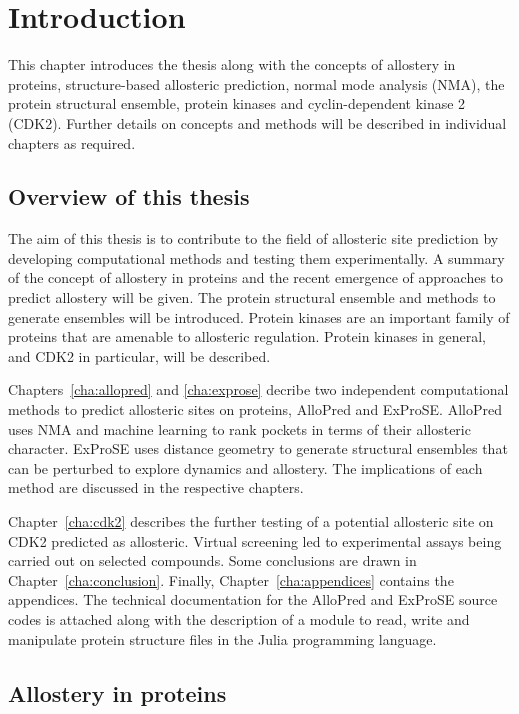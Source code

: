 \chapter{Introduction}
\label{cha:introduction}

This chapter introduces the thesis along with the concepts of allostery in proteins, structure-based allosteric prediction, normal mode analysis (NMA), the protein structural ensemble, protein kinases and cyclin-dependent kinase 2 (CDK2).
Further details on concepts and methods will be described in individual chapters as required.


\section{Overview of this thesis}
\label{sec:introduction_overview}

The aim of this thesis is to contribute to the field of allosteric site prediction by developing computational methods and testing them experimentally.
A summary of the concept of allostery in proteins and the recent emergence of approaches to predict allostery will be given.
The protein structural ensemble and methods to generate ensembles will be introduced.
Protein kinases are an important family of proteins that are amenable to allosteric regulation.
Protein kinases in general, and CDK2 in particular, will be described.

Chapters~\ref{cha:allopred} and \ref{cha:exprose} decribe two independent computational methods to predict allosteric sites on proteins, AlloPred and ExProSE.
AlloPred uses NMA and machine learning to rank pockets in terms of their allosteric character.
ExProSE uses distance geometry to generate structural ensembles that can be perturbed to explore dynamics and allostery.
The implications of each method are discussed in the respective chapters.

Chapter~\ref{cha:cdk2} describes the further testing of a potential allosteric site on CDK2 predicted as allosteric.
Virtual screening led to experimental assays being carried out on selected compounds.
Some conclusions are drawn in Chapter~\ref{cha:conclusion}.
Finally, Chapter~\ref{cha:appendices} contains the appendices.
The technical documentation for the AlloPred and ExProSE source codes is attached along with the description of a module to read, write and manipulate protein structure files in the Julia programming language.


\section{Allostery in proteins}
\label{sec:introduction_allostery}

